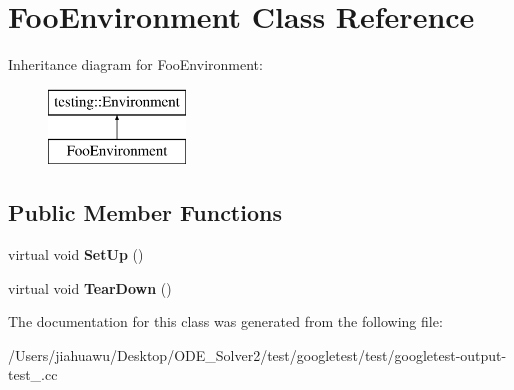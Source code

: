 \hypertarget{class_foo_environment}{}\section{Foo\+Environment Class Reference}
\label{class_foo_environment}
Inheritance diagram for Foo\+Environment\+:\begin{figure}[H]
\begin{center}
\leavevmode
\includegraphics[height=2.000000cm]{class_foo_environment}
\end{center}
\end{figure}
\subsection*{Public Member Functions}
\begin{DoxyCompactItemize}
\item 
\mbox{\label{class_foo_environment_a7db8d8b312805aff437ae8534132a56d}} 
virtual void {\bfseries Set\+Up} ()
\item 
\mbox{\label{class_foo_environment_a99a2c9df52106cce9e7a4bdda53df802}} 
virtual void {\bfseries Tear\+Down} ()
\end{DoxyCompactItemize}


The documentation for this class was generated from the following file\+:\begin{DoxyCompactItemize}
\item 
/\+Users/jiahuawu/\+Desktop/\+O\+D\+E\+\_\+\+Solver2/test/googletest/test/googletest-\/output-\/test\+\_\+.\+cc\end{DoxyCompactItemize}
